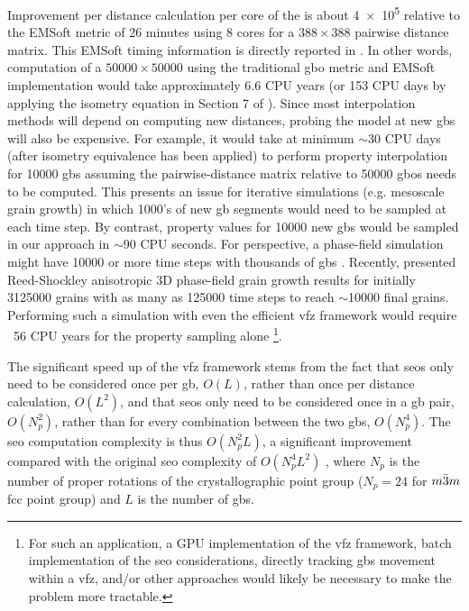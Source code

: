 \documentclass[final,twocolumn,12pt]{elsarticle}
\begin{document}
Improvement per distance calculation per core of the \vfzorepo{} is about \num{4e5} relative to the EMSoft \cite{degraefEMSoft2020} metric of 26 minutes using 8 cores for a $\num{388}\times\num{388}$ pairwise distance matrix. This EMSoft timing information is directly reported in \citet{chesserLearningGrainBoundary2020}. In other words, computation of a $\num{50000}\times\num{50000}$ using the traditional \gls{gbo} metric and EMSoft implementation would take approximately 6.6 CPU years (or 153 CPU days by applying the isometry equation in Section 7 of \citet{morawiecDistancesGrainInterfaces2019}). Since most interpolation methods will depend on computing new distances, probing the model at new \glspl{gb} will also be expensive. For example, it would take at minimum $\sim$30 CPU days (after isometry equivalence has been applied) to perform property interpolation for \num{10000} \outpt{} \glspl{gb} assuming the pairwise-distance matrix relative to \num{50000} \inpt{} \glspl{gbo} needs to be computed. This presents an issue for iterative simulations (e.g. mesoscale grain growth) in which \num{1000}'s of new \gls{gb} segments would need to be sampled at each time step. By contrast, property values for \num{10000} new \glspl{gb} would be sampled in our approach in $\sim$\num{90} CPU seconds. For perspective, a phase-field simulation might have \num{10000} or more time steps with thousands of \glspl{gb} \citet{kimPhasefieldModeling3D2014,dimokratiSPFMModelIdeal2020}.  Recently, \citet{miyoshiLargescalePhasefieldStudy2021} presented Reed-Shockley anisotropic 3D phase-field grain growth results for initially \num{3125000} grains with as many as \num{125000} time steps to reach $\sim$\num{10000} final grains. Performing such a simulation with even the efficient \gls{vfz} framework would require ~56 CPU years for the property sampling alone \footnote{For such an application, a GPU implementation of the \gls{vfz} framework, batch implementation of the \gls{seo} considerations, directly tracking \glspl{gb} movement within a \gls{vfz}, and/or other approaches would likely be necessary to make the problem more tractable.}. %

The significant speed up of the \gls{vfz} framework stems from the fact that \glspl{seo} only need to be considered once per \gls{gb}, $O(L)$, rather than once per distance calculation, $O(L^2)$,
and that \glspl{seo} only need to be considered once in a \gls{gb} pair, $O(N_p^2)$, rather than for every combination between the two \glspl{gb}, $O(N_p^4)$. The \gls{seo} computation complexity is thus $O(N_p^2L)$, a significant improvement compared with the original \gls{seo} complexity of $O(N_p^4L^2)$ \cite{chesserLearningGrainBoundary2020}, where $N_p$ is the number of proper rotations of the crystallographic point group ($N_p=24$ for $m\Bar{3}m$ \gls{fcc} point group) and $L$ is the number of \glspl{gb}.
\end{document}
